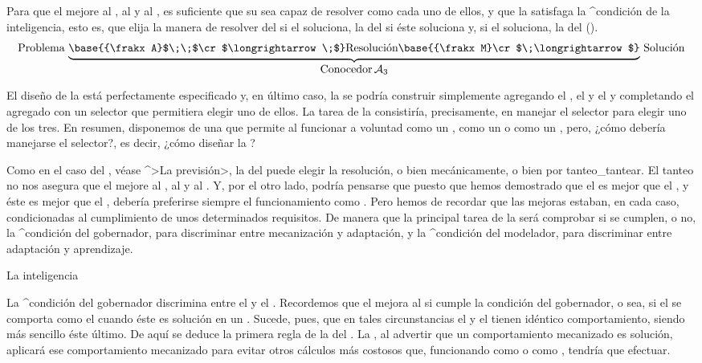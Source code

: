\noindent Para que el {\conocedor} mejore al {\mecanismo},
al {\adaptador} y al {\aprendiz}, es suficiente que su {\mente} sea
capaz de resolver como cada uno de ellos, y que la {\inteligencia}
satisfaga la ^{condición de la inteligencia}, esto es, que elija la
manera de resolver del {\mecanismo} si el {\mecanismo} soluciona, la del
{\adaptador} si éste soluciona y, si el {\aprendiz} soluciona, la del
{\aprendiz} ().
$$\hbox{Problema}\,
   \underbrace{\strut
    \base{{\frakx A}$\;\;$\cr $\longrightarrow\;$}
  \hbox{Resolución}
    \base{{\frakx M}\cr $\;\longrightarrow$}}_{\hbox{%
     Conocedor$\,{\cal A}_3$}}
  \,\hbox{Solución}
$$
\endpoints

El diseño de la {\mente} está perfectamente especificado y, en último
caso, la {\mente} se podría construir simplemente agregando el
{\mecanismo}, el {\adaptador} y el {\aprendiz} y completando el agregado
con un selector que permitiera elegir uno de ellos. La tarea de la
{\inteligencia} consistiría, precisamente, en manejar el selector para
elegir uno de los tres. En resumen, disponemos de una {\mente} que
permite al {\conocedor} funcionar a voluntad como un {\mecanismo}, como
un {\adaptador} o como un {\aprendiz}, pero, ¿cómo debería manejarse el
selector?, es decir, ¿cómo diseñar la {\inteligencia}?

Como en el caso del {\gobernador}, véase ^>La previsión>, la
{\inteligencia} del {\conocedor} puede elegir la resolución, o bien
mecánicamente, o bien por tanteo_{tantear}. El tanteo no nos asegura que
el {\conocedor} mejore al {\mecanismo}, al {\adaptador} y al
{\aprendiz}. Y, por el otro lado, podría pensarse que puesto que hemos
demostrado que el {\aprendiz} es mejor que el {\adaptador}, y éste es
mejor que el {\mecanismo}, debería preferirse siempre el funcionamiento
como {\aprendiz}. Pero hemos de recordar que las mejoras estaban, en
cada caso, condicionadas al cumplimiento de unos determinados
requisitos. De manera que la principal tarea de la {\inteligencia} será
comprobar si se cumplen, o no, la ^{condición del gobernador}, para
discriminar entre mecanización y adaptación, y la ^{condición del
modelador}, para discriminar entre adaptación y aprendizaje.


\Section La inteligencia

La ^{condición del gobernador} discrimina entre el {\mecanismo} y el
{\adaptador}. Recordemos que el {\adaptador} mejora al {\mecanismo} si
cumple la condición del gobernador, o sea, si el {\adaptador} se
comporta como el {\mecanismo} cuando éste es solución en un {\universo}.
Sucede, pues, que en tales circunstancias el {\adaptador} y el
{\mecanismo} tienen idéntico comportamiento, siendo más sencillo éste
último. De aquí se deduce la primera regla de la {\inteligencia} del
{\conocedor}. La {\inteligencia}, al advertir que un comportamiento
mecanizado es solución, aplicará ese comportamiento \hbox{mecanizado}
para evitar otros cálculos más costosos que, funcionando como
{\adaptador} o como {\aprendiz}, tendría que efectuar.

